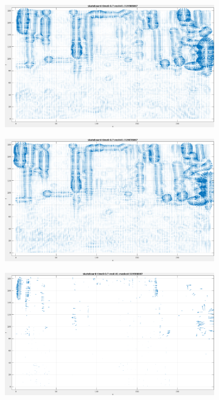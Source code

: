 \begin{figure}[tb]
\centering
\begin{subfigure}{.45\textwidth}
  \centering
  \includegraphics[height=.6\linewidth]{figs/skateboard/skateboard-1.png}
  \caption{}
  \label{fig:skateboard-snapshots1}
\end{subfigure}
\begin{subfigure}{.45\textwidth}
  \centering
  \includegraphics[height=.6\linewidth]{figs/skateboard/skateboard-2.png}
  \caption{}
  \label{fig:skateboard-snapshots2}
\end{subfigure}
\begin{subfigure}{.45\textwidth}
  \includegraphics[height=.6\linewidth]{figs/skateboard/skateboard-masked-1.png}

\end{subfigure}
\end{figure}

